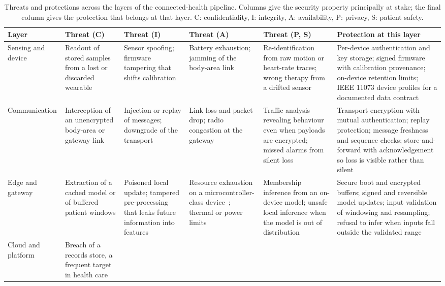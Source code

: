 \documentclass[journal]{IEEEtran}
\begin{document}
\begin{table}[tbp]
\centering
\caption{Threats and protections across the layers of the connected-health pipeline.
Columns give the security property principally at stake; the final column gives the
protection that belongs at that layer. C: confidentiality, I: integrity, A: availability,
P: privacy, S: patient safety.}
\label{tab:threats}
\footnotesize
\setlength{\tabcolsep}{3pt}
\renewcommand{\arraystretch}{1.15}
\begin{tabularx}{\textwidth}{L{1.9cm} L{2.6cm} L{2.4cm} L{2.2cm} L{2.4cm} X}
\toprule
\textbf{Layer} & \textbf{Threat (C)} & \textbf{Threat (I)} & \textbf{Threat (A)} & \textbf{Threat (P, S)} & \textbf{Protection at this layer} \\
\midrule
Sensing and device &
Readout of stored samples from a lost or discarded wearable &
Sensor spoofing; firmware tampering that shifts calibration &
Battery exhaustion; jamming of the body-area link &
Re-identification from raw motion or heart-rate traces; wrong therapy from a drifted sensor &
Per-device authentication and key storage; signed firmware with calibration provenance; on-device retention limits; IEEE 11073 device profiles for a documented data contract~\cite{ieee11073std} \\
\addlinespace[2pt]
Communication &
Interception of an unencrypted body-area or gateway link &
Injection or replay of messages; downgrade of the transport &
Link loss and packet drop; radio congestion at the gateway &
Traffic analysis revealing behaviour even when payloads are encrypted; missed alarms from silent loss &
Transport encryption with mutual authentication; replay protection; message freshness and sequence checks; store-and-forward with acknowledgement so loss is visible rather than silent \\
\addlinespace[2pt]
Edge and gateway &
Extraction of a cached model or of buffered patient windows &
Poisoned local update; tampered pre-processing that leaks future information into features &
Resource exhaustion on a microcontroller-class device~\cite{saha2022mcuml}; thermal or power limits &
Membership inference from an on-device model; unsafe local inference when the model is out of distribution &
Secure boot and encrypted buffers; signed and reversible model updates; input validation of windowing and resampling; refusal to infer when inputs fall outside the validated range \\
\addlinespace[2pt]
Cloud and platform &
Breach of a records store, a frequent target in health care~\cite{Seh2020HealthcareDataBreaches} &

\end{tabularx}
\end{table}
\end{document}
